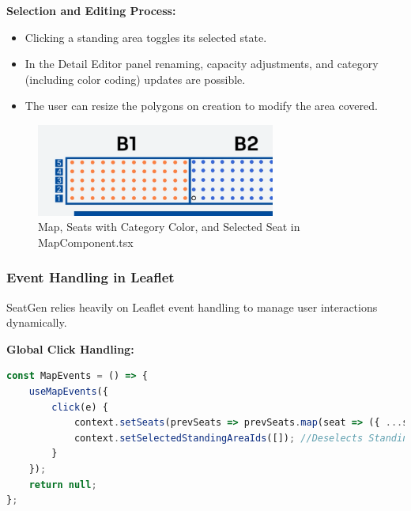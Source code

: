 \textbf{Selection and Editing Process:}
\begin{itemize}
    \item Clicking a standing area toggles its selected state.
    \item In the Detail Editor panel renaming, capacity adjustments, and category (including color coding) updates are possible.
    \item The user can resize the polygons on creation to modify the area covered.
\end{itemize}

\begin{figure}[H]
    \centering
    \includegraphics[width=0.7\textwidth]{pics/MapComponentCategoryAndSelectedSeat.png}
    \caption{Map, Seats with Category Color, and Selected Seat in MapComponent.tsx}
    \label{fig:map-component-category}
\end{figure}

\subsubsection{Event Handling in Leaflet}

SeatGen relies heavily on Leaflet event handling to manage user interactions dynamically.

\textbf{Global Click Handling:}
\begin{lstlisting}[language=TypeScript, caption=Handling Global Click Events, label=lst:leaflet-global-click]
const MapEvents = () => {
    useMapEvents({
        click(e) {
            context.setSeats(prevSeats => prevSeats.map(seat => ({ ...seat, selected: false })));
            context.setSelectedStandingAreaIds([]); //Deselects Standing Areas because Seats are selected
        }
    });
    return null;
};
\end{lstlisting}

